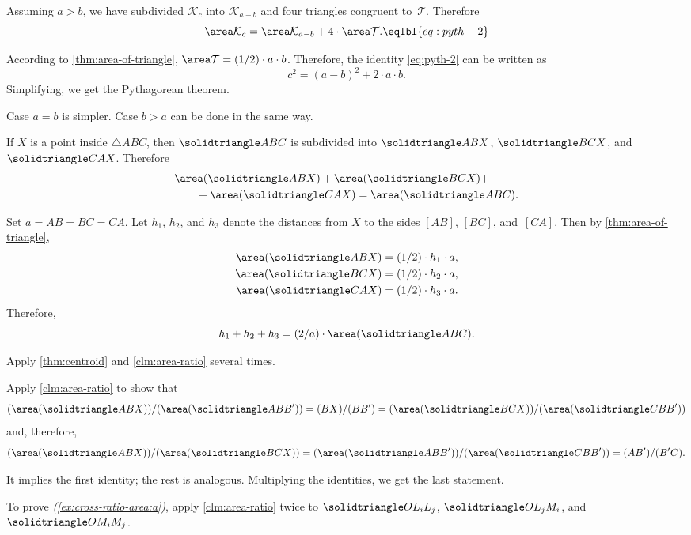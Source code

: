 Assuming $a>b$,
we have subdivided $\mathcal{K}_c$ into $\mathcal{K}_{a-b}$ and four triangles congruent to~$\mathcal{T}$.
Therefore
\[\area\mathcal{K}_c=\area\mathcal{K}_{a-b}+4\cdot\area\mathcal{T}.
\eqlbl{eq:pyth-2}\]

According to \ref{thm:area-of-triangle},
$\area\mathcal{T}=\tfrac12\cdot a\cdot b$. 
Therefore, the identity \ref{eq:pyth-2} can be written as 
\[c^2=(a-b)^2+2\cdot a\cdot b.\]
Simplifying, we get the Pythagorean theorem.

Case $a=b$ is simpler.
Case $b>a$ can be done in the same way.


If $X$ is a point inside $\triangle ABC$, then $\solidtriangle ABC$ is subdivided into $\solidtriangle ABX$, $\solidtriangle BCX$, and $\solidtriangle CAX$.
Therefore
\begin{align*}
&\area(\solidtriangle ABX)
+\area(\solidtriangle BCX)+
\\
&\qquad+\area(\solidtriangle CAX)
=\area(\solidtriangle ABC).
\end{align*}

Set $a=AB=BC=CA$.
Let $h_1$, $h_2$, and $h_3$ denote the distances from $X$ to the sides $[AB]$, $[BC]$, and~$[CA]$. 
Then by \ref{thm:area-of-triangle},
\begin{align*}
\area(\solidtriangle ABX)&=\tfrac12\cdot h_1\cdot a,
\\
\area(\solidtriangle BCX)&=\tfrac12\cdot h_2\cdot a,
\\
\area(\solidtriangle CAX)&=\tfrac12\cdot h_3\cdot a.
\end{align*}
Therefore, 
\[h_1+h_2+h_3=\tfrac2a\cdot\area(\solidtriangle ABC).\]

Apply \ref{thm:centroid} and \ref{clm:area-ratio} several times.

Apply \ref{clm:area-ratio} to show that
\[\frac{\area(\solidtriangle ABX)}{\area(\solidtriangle ABB')}=\frac{BX}{BB'}=\frac{\area(\solidtriangle BCX)}{\area(\solidtriangle CBB')}\]
and, therefore,
\[\frac{\area(\solidtriangle ABX)}{\area(\solidtriangle BCX)}=\frac{\area(\solidtriangle ABB')}{\area(\solidtriangle CBB')}=\frac{AB'}{B'C}.\]

It implies the first identity; the rest is analogous.
Multiplying the identities, we get the last statement.

To prove \textit{(\ref{ex:cross-ratio-area:a})}, apply \ref{clm:area-ratio} twice to $\solidtriangle OL_iL_j$, $\solidtriangle OL_jM_i$, and $\solidtriangle OM_iM_j$.

